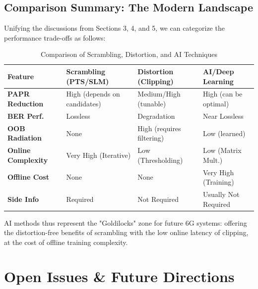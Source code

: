 \documentclass[journal]{IEEEtran}
\begin{document}
\subsection{Comparison Summary: The Modern Landscape}
Unifying the discussions from Sections 3, 4, and 5, we can categorize the performance trade-offs as follows:

\begin{table}[htbp]
    \caption{Comparison of Scrambling, Distortion, and AI Techniques}
    \begin{center}
        \begin{tabular}{|l|p{2.5cm}|p{2.5cm}|p{2.5cm}|}
            \hline
            \textbf{Feature}           & \textbf{Scrambling (PTS/SLM)} & \textbf{Distortion (Clipping)} & \textbf{AI/Deep Learning} \\ \hline
            \textbf{PAPR Reduction}    & High (depends on candidates)  & Medium/High (tunable)          & High (can be optimal)     \\ \hline
            \textbf{BER Perf.}         & Lossless                      & Degradation                    & Near Lossless             \\ \hline
            \textbf{OOB Radiation}     & None                          & High (requires filtering)      & Low (learned)             \\ \hline
            \textbf{Online Complexity} & Very High (Iterative)         & Low (Thresholding)             & Low (Matrix Mult.)        \\ \hline
            \textbf{Offline Cost}      & None                          & None                           & Very High (Training)      \\ \hline
            \textbf{Side Info}         & Required                      & Not Required                   & Usually Not Required      \\ \hline
        \end{tabular}
        \label{tab2}
    \end{center}
\end{table}

AI methods thus represent the "Goldilocks" zone for future 6G systems: offering the distortion-free benefits of scrambling with the low online latency of clipping, at the cost of offline training complexity.

\section{Open Issues \& Future Directions}
\end{document}
